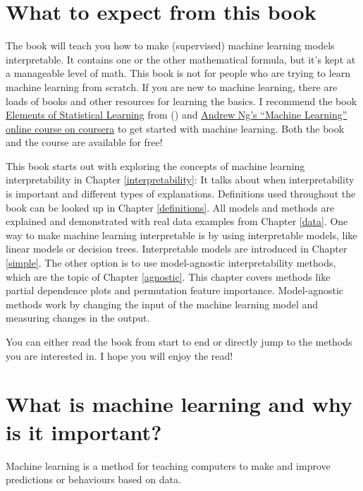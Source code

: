 \documentclass[12pt,]{krantz}
\theoremstyle{definition}
\theoremstyle{definition}
\theoremstyle{definition}
\theoremstyle{remark}
\begin{document}
\section{What to expect from this
book}\label{what-to-expect-from-this-book}

The book will teach you how to make (supervised) machine learning models
interpretable. It contains one or the other mathematical formula, but
it's kept at a manageable level of math. This book is not for people who
are trying to learn machine learning from scratch. If you are new to
machine learning, there are loads of books and other resources for
learning the basics. I recommend the book
\href{https://web.stanford.edu/~hastie/ElemStatLearn/}{Elements of
Statistical Learning} from (\citet{Hastie2009}) and
\href{https://www.coursera.org/learn/machine-learning}{Andrew Ng's
``Machine Learning'' online course on coursera} to get started with
machine learning. Both the book and the course are available for free!

This book starts out with exploring the concepts of machine learning
interpretability in Chapter \ref{interpretability}: It talks about when
interpretability is important and different types of explanations.
Definitions used throughout the book can be looked up in Chapter
\ref{definitions}. All models and methods are explained and demonstrated
with real data examples from Chapter \ref{data}. One way to make machine
learning interpretable is by using interpretable models, like linear
models or decision trees. Interpretable models are introduced in Chapter
\ref{simple}. The other option is to use model-agnostic interpretability
methods, which are the topic of Chapter \ref{agnostic}. This chapter
covers methods like partial dependence plots and permutation feature
importance. Model-agnostic methods work by changing the input of the
machine learning model and measuring changes in the output.

You can either read the book from start to end or directly jump to the
methods you are interested in. I hope you will enjoy the read!

\section{What is machine learning and why is it
important?}\label{what-is-machine-learning-and-why-is-it-important}

Machine learning is a method for teaching computers to make and improve
predictions or behaviours based on data.
\end{document}
